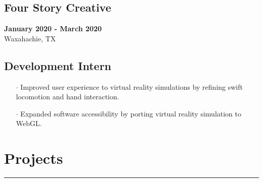 \documentclass[10pt]{article}
\begin{document}
\begin{paracol}{2}
    \begin{leftcolumn} 
        \sloppy
        \subsection*{Four Story Creative}
        \textbf{January 2020 -  March 2020} \\ 
        Waxahachie, TX
    \end{leftcolumn}

    \begin{rightcolumn} 
        \subsection*{Development Intern}
        \begin{itemize}[leftmargin=.28cm, itemsep=1pt]
            \item[$\cdot$] Improved user experience to virtual reality simulations by refining swift locomotion and hand interaction.
            \item[$\cdot$] Expanded software accessibility by porting virtual reality simulation to WebGL.
        \end{itemize}
    \end{rightcolumn}
\end{paracol}

\section*{Projects}
\vspace{-.6cm}
\par\noindent\textcolor{black}{\rule{\textwidth}{.5pt}}
\vspace{-.8cm}
\end{document}
